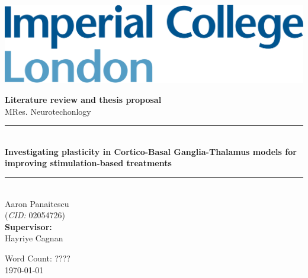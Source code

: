 



\begin{titlepage}
	\newcommand{\HRule}{\rule{\linewidth}{0.5mm}}
	\setlength{\topmargin}{0in}
	\center

	\begin{flushleft} \large
		\begin{minipage}{0.4\textwidth}
			\includegraphics[scale=0.14]{imperial.png}
		\end{minipage}
	\end{flushleft}
	\vspace{4cm}

	\textbf{\large Literature review and thesis proposal}\\[0.1cm]
	{\large MRes. Neurotechonlogy}\\[0.5cm]

	\HRule \\[0.4cm]
	{\Large \bfseries Investigating plasticity in Cortico-Basal Ganglia-Thalamus models for improving stimulation-based treatments }
	\HRule \\[1cm]


	{\large Aaron Panaitescu \\
	(\textit{CID:} 02054726) \\[0.4cm]
	\textbf{Supervisor:} \\
	Hayriye Cagnan}


	\vfill
	{Word Count: ????}\\[0.4cm]
	{\large \today}\\[0.8cm]
\end{titlepage}
\tableofcontents
\newpage


